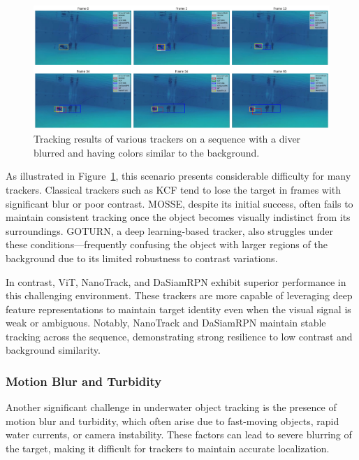 \begin{figure}[ht]
    \centering
    \includegraphics[width=1\textwidth]{images/ArmyDiver3.png}
    \caption{Tracking results of various trackers on a sequence with a diver blurred and having colors similar to the background.}
    \label{fig:low_contrast_example}
\end{figure}

As illustrated in Figure~\ref{fig:low_contrast_example}, this scenario presents considerable difficulty for many trackers. Classical trackers such as KCF tend to lose the target in frames with significant blur or poor contrast. MOSSE, despite its initial success, often fails to maintain consistent tracking once the object becomes visually indistinct from its surroundings. GOTURN, a deep learning-based tracker, also struggles under these conditions—frequently confusing the object with larger regions of the background due to its limited robustness to contrast variations.

In contrast, ViT, NanoTrack, and DaSiamRPN exhibit superior performance in this challenging environment. These trackers are more capable of leveraging deep feature representations to maintain target identity even when the visual signal is weak or ambiguous. Notably, NanoTrack and DaSiamRPN maintain stable tracking across the sequence, demonstrating strong resilience to low contrast and background similarity.

\subsubsection{ Motion Blur and Turbidity}

Another significant challenge in underwater object tracking is the presence of motion blur and turbidity, which often arise due to fast-moving objects, rapid water currents, or camera instability. These factors can lead to severe blurring of the target, making it difficult for trackers to maintain accurate localization.

